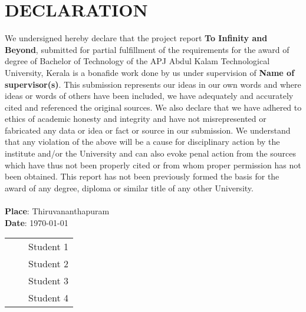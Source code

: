 \section*{\centering DECLARATION}

  We undersigned hereby declare that the project report \textbf{To Infinity and Beyond}, submitted for partial fulfillment of the requirements for the award of degree of Bachelor of Technology of the APJ Abdul Kalam Technological University, Kerala is a bonafide work done by us under supervision of \textbf{Name of supervisor(s)}. This submission represents our ideas in our own words and where ideas or words of others have been included, we have adequately and accurately cited and referenced the original sources. We also declare that we have adhered to ethics of academic honesty and integrity and have not misrepresented or fabricated any data or idea or fact or source in our submission. We understand that any violation of the above will be a cause for disciplinary action by the institute and/or the University and can also evoke penal action from the sources which have thus not been properly cited or from whom proper permission has not been obtained. This report has not been previously formed the basis for the award of any degree, diploma or similar title of any other University. \\ \\
\textbf{Place}: Thiruvananthapuram \\
\textbf{Date}: \today          \\ 
\begin{tabular}{ p{6cm} p{5cm} p{6cm} } 

                                    &&  Student 1 \\ 
                                    &&  Student 2 \\
                                    &&  Student 3 \\
                                    &&  Student 4 \\
\end{tabular}

\newpage